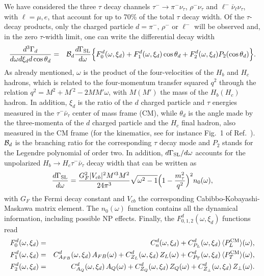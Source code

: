 \documentclass[aps,superscriptaddress,showpacs,nofootinbib,11pt]{revtex4-1}
\newcommand{\be}{\begin{equation}} \newcommand{\ee}{\end{equation}}
\newcommand{\bea}{\begin{eqnarray}} \newcommand{\eea}{\end{eqnarray}}
\begin{document}
We have considered the three $\tau$ decay channels 
$\tau^-\to\pi^-\nu_\tau$, $\rho^-\nu_\tau$ and $\ell^-\bar\nu_\ell \nu_\tau$, with 
$\ell=\mu,e$, that account for up to 70\% of the total $\tau$ decay width. Of the $\tau$-decay products, only the charged 
particle $d=\pi^-,\,\rho^-$ or $\ell^-$ will be observed and, in the zero $\tau$-width limit, one can write the differential
 decay width~\cite{Alonso:2016gym,Alonso:2017ktd, Asadi:2020fdo,Penalva:2021wye}
%
%
\bea
\frac{d^3\Gamma_d}{d\omega  d\xi_d d\cos\theta_d} & = & {\cal B}_{d}
\frac{d\Gamma_{\rm SL}}{d\omega} \Big\{  F^d_0(\omega,\xi_d)+ F^d_1(\omega,\xi_d) 
\cos\theta_d + F^d_2(\omega,\xi_d)P_2(\cos\theta_d)\Big\}.\label{eq:visible-distr}
\eea
As already mentioned,  $\omega$ is 
the product of the four-velocities of the $H_b$ and $H_c$ hadrons, which is related to
the four-momentum transfer squared $q^2$ through the relation $q^2=M^2+M^{\prime 2}-2MM'\omega$, with
$M(M')$ the  mass of the $H_b(H_c)$ hadron. In addition, $\xi_d$ is the ratio of the
$d$ charged particle  and $\tau$ energies measured in the $\tau^-\bar\nu_\tau$ 
center of mass frame (CM), while $\theta_d$ is the angle made by the three-momenta of the
$d$ charged particle and the $H_c$ final hadron, also measured in the CM frame (for the kinematics, see for instance Fig.~1 of Ref.~\cite{Penalva:2022vxy}). ${\cal B}_d$ is the branching ratio for the
corresponding $\tau$ decay mode  and $P_2$ 
stands for  the Legendre polynomial 
of order two. In addition, $d\Gamma_{\rm SL}/d\omega$ accounts for the
unpolarized $H_b\to H_c\tau^-\bar\nu_\tau$ decay width that can be written
as~\cite{Penalva:2022vxy}
\be
\frac{d\Gamma_{\rm SL}}{d\omega}=\frac{G_F^2|V_{cb}|^2M^{\prime3}M^2}{24\pi^3} \label{eq:n0w}
\sqrt{\omega^2-1}\Big(1-\frac{m_\tau^2}{q^2}\Big)^2n_0(\omega),
\ee
with $G_F$ the Fermi decay constant and $V_{cb}$ the corresponding 
Cabibbo-Kobayashi-Maskawa matrix element. The  $n_0(\omega)$ function contains
 all the dynamical information, including possible NP effects.
Finally, the $F^d_{0,1,2}(\omega,\xi_d)$  functions read~\cite{Penalva:2021wye}
%
 \begin{eqnarray}
 F^d_0(\omega,\xi_d) &=& C_n^d(\omega,\xi_d)+C_{P_L}^d(\omega,\xi_d)\,\langle P^{\rm CM}_L\rangle(\omega), \nonumber \\
 F^d_1(\omega,\xi_d) &=& C_{A_{FB}}^d(\omega,\xi_d)\,A_{FB}(\omega)+C_{Z_L}^d(\omega,\xi_d)\,Z_L(\omega)
 + C_{P_T}^d(\omega,\xi_d)\,\langle P^{\rm CM}_T\rangle(\omega), \nonumber \\ 
 F^d_2(\omega,\xi_d) &=& C_{A_Q}^d(\omega,\xi_d)\,A_{Q}(\omega)+
 C_{Z_Q}^d(\omega,\xi_d)\,Z_Q(\omega)+ C_{Z_\perp}^d(\omega,\xi_d)\,Z_\perp(\omega).
 \label{eq:coeff}
\end{eqnarray}
\end{document}
